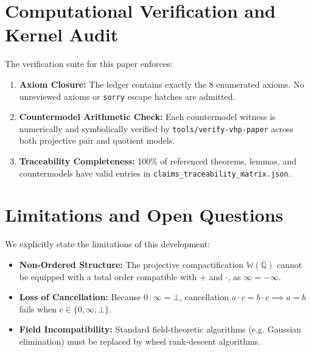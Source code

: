 \documentclass[11pt,a4paper]{article}
\theoremstyle{plain}
\theoremstyle{definition}
\theoremstyle{remark}
\newcommand{\W}{\mathbb{W}}
\newcommand{\Q}{\mathbb{Q}}
\newcommand{\bott}{\bot}
\newcommand{\inft}{\infty}
\begin{document}
\section{Computational Verification and Kernel Audit}
\label{sec:verification}

The verification suite for this paper enforces:
\begin{enumerate}
    \item \textbf{Axiom Closure:} The ledger contains exactly the 8 enumerated axioms. No unreviewed axioms or \texttt{sorry} escape hatches are admitted.
    \item \textbf{Countermodel Arithmetic Check:} Each countermodel witness is numerically and symbolically verified by \texttt{tools/verify-vhp-paper} across both projective pair and quotient models.
    \item \textbf{Traceability Completeness:} 100\% of referenced theorems, lemmas, and countermodels have valid entries in \texttt{claims_traceability_matrix.json}.
\end{enumerate}

\section{Limitations and Open Questions}
\label{sec:limitations}

We explicitly state the limitations of this development:
\begin{itemize}
    \item \textbf{Non-Ordered Structure:} The projective compactification $\W(\Q)$ cannot be equipped with a total order compatible with $+$ and $\cdot$, as $\inft = -\inft$.
    \item \textbf{Loss of Cancellation:} Because $0 \cdot \inft = \bott$, cancellation $a \cdot c = b \cdot c \implies a = b$ fails when $c \in \{0, \inft, \bott\}$.
    \item \textbf{Field Incompatibility:} Standard field-theoretic algorithms (e.g. Gaussian elimination) must be replaced by wheel rank-descent algorithms.
\end{itemize}
\end{document}
